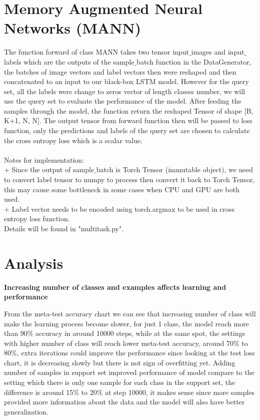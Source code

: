 \documentclass[]{article}
\begin{document}
	\section{Memory Augmented Neural Networks (MANN)}
	The function forward of class MANN takes two tensor input$\_$images and input$\_$labels which are the outputs of the sample$\_$batch function in the DataGenerator, the batches of image vectors and label vectors then were reshaped and then concatenated to an input to our black-box LSTM model. However for the query set, all the labels were change to zeros vector of length classes number, we will use the query set to evaluate the performance of the model. After feeding the samples through the model, the function return the reshaped Tensor of shape [B, K+1, N, N]. The output tensor from forward function then will be passed to loss function, only the predictions and labels of the query set are chosen to calculate the cross entropy loss which is a scalar value. \\
	\\
	Notes for implementation: \\
	+ Since the output of sample$\_$batch is Torch Tensor (immutable object), we need to convert label tensor to numpy to process then convert it back to Torch Tensor, this may cause some bottleneck in some cases when CPU and GPU are both used.\\
	+ Label vector needs to be encoded using torch.argmax to be used in cross entropy loss function. \\ 
	Details will be found in "multitask.py".
	
	\section{Analysis}
	\textbf{Increasing number of classes and examples affects learning and performance}

	From the meta-test accuracy chart we can see that increasing number of class will make the learning process become slower, for just 1 class, the model reach more than 90\% accuracy in around 10000 steps, while at the same spot, the settings with higher number of class will reach lower meta-test accuracy, around 70\% to 80\%, extra iterations could improve the performance since looking at the test loss chart, it is decreasing slowly but there is not sign of overfitting yet. Adding number of samples in support set improved performance of model compare to the setting which there is only one sample for each class in the support set, the difference is around 15\% to 20\% at step 10000, it makes sense since more samples provided more information about the data and the model will also have better generalization.
	
\end{document}

